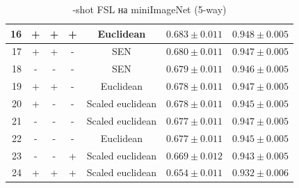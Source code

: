 \documentclass[a4paper, 12pt]{report}
\begin{document}
\begin{table}[h!]
\begin{adjustbox}{center}
\begin{tabular}{| r | c c c c | c |  c | }
    \hline
 16 & +               & +      & +      & Euclidean        & $0.683 \pm 0.011$ & $0.948 \pm 0.005$ \\
    \hline
 17 & +               & +      & -      & SEN              & $0.680 \pm 0.011$ & $0.947 \pm 0.005$ \\
    \hline
 18 & -               & -      & -      & SEN              & $0.679 \pm 0.011$ & $0.946 \pm 0.005$ \\
    \hline
 19 & +               & +      & -      & Euclidean        & $0.678 \pm 0.011$ & $0.947 \pm 0.005$ \\
    \hline
 20 & +               & -      & -      & Scaled euclidean & $0.678 \pm 0.011$ & $0.945 \pm 0.005$ \\
    \hline
 21 & -               & -      & -      & Scaled euclidean & $0.677 \pm 0.011$ & $0.947 \pm 0.005$ \\
    \hline
 22 & -               & -      & -      & Euclidean        & $0.677 \pm 0.011$ & $0.945 \pm 0.005$ \\
    \hline
 23 & -               & -      & +      & Scaled euclidean & $0.669 \pm 0.012$ & $0.943 \pm 0.005$ \\
    \hline
 24 & +               & +      & +      & Scaled euclidean & $0.654 \pm 0.011$ & $0.932 \pm 0.006$ \\
\hline
\end{tabular}
\end{adjustbox}
\caption{-shot FSL на miniImageNet (5-way)}
\end{table}
 
\end{document}
